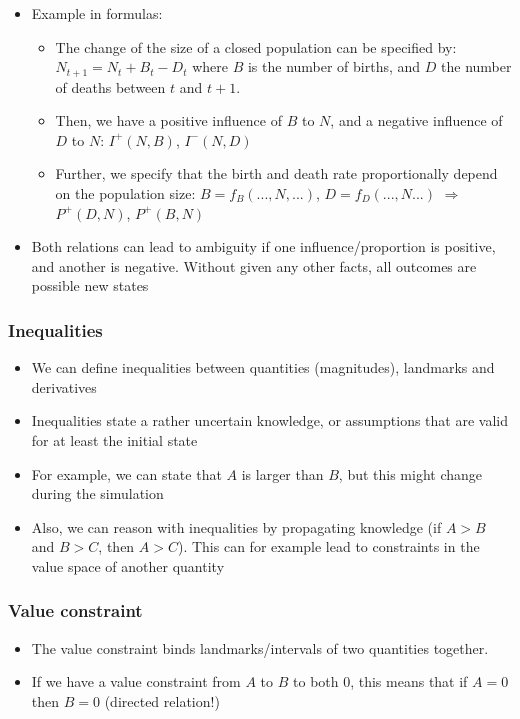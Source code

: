 \begin{itemize}
\begin{itemize}
	\end{itemize}
	\item Example in formulas:
	\begin{itemize}
		\item The change of the size of a closed population can be specified by:
		$N_{t+1} = N_{t} + B_{t} - D_{t}$
		where $B$ is the number of births, and $D$ the number of deaths between $t$ and $t+1$.
		\item Then, we have a positive influence of $B$ to $N$, and a negative influence of $D$ to $N$: $I^{+}(N,B)$, $I^{-}(N,D)$
		\item Further, we specify that the birth and death rate proportionally depend on the population size: $B=f_B(...,N,...)$, $D=f_D(...,N...)$ $\Rightarrow$ $P^{+}(D,N)$, $P^{+}(B,N)$
	\end{itemize}
	\item Both relations can lead to ambiguity if one influence/proportion is positive, and another is negative. Without given any other facts, all outcomes are possible new states
\end{itemize}
\subsubsection{Inequalities}
\begin{itemize}
	\item We can define inequalities between quantities (magnitudes), landmarks and derivatives
	\item Inequalities state a rather uncertain knowledge, or assumptions that are valid for at least the initial state
	 \item For example, we can state that $A$ is larger than $B$, but this might change during the simulation
	 \item Also, we can reason with inequalities by propagating knowledge (if $A>B$ and $B>C$, then $A>C$). This can for example lead to constraints in the value space of another quantity
\end{itemize}
\subsubsection{Value constraint}
\begin{itemize}
	\item The value constraint binds landmarks/intervals of two quantities together.
	\item If we have a value constraint from $A$ to $B$ to both 0, this means that if $A=0$ then $B=0$ (directed relation!)
\end{itemize}
